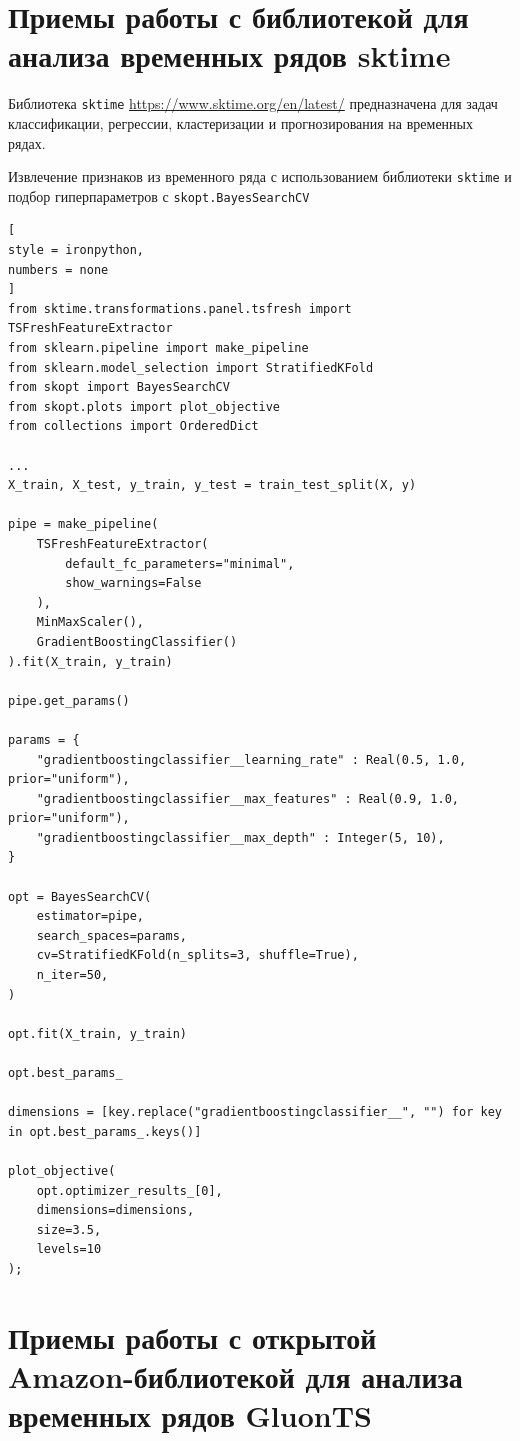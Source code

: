 \documentclass[%
	11pt,
	a4paper,
	utf8,
		]{article}
\begin{document}
\section{Приемы работы с библиотекой для анализа временных рядов sktime}

Библиотека \texttt{sktime} \url{https://www.sktime.org/en/latest/} предназначена для задач классификации, регрессии, кластеризации и прогнозирования на временных рядах.

Извлечение признаков из временного ряда с использованием библиотеки \texttt{sktime} и подбор гиперпараметров с \texttt{skopt.BayesSearchCV}
\begin{lstlisting}[
style = ironpython,
numbers = none	
]
from sktime.transformations.panel.tsfresh import TSFreshFeatureExtractor
from sklearn.pipeline import make_pipeline
from sklearn.model_selection import StratifiedKFold
from skopt import BayesSearchCV
from skopt.plots import plot_objective
from collections import OrderedDict

...
X_train, X_test, y_train, y_test = train_test_split(X, y)

pipe = make_pipeline(
    TSFreshFeatureExtractor(
        default_fc_parameters="minimal",
        show_warnings=False
    ),
    MinMaxScaler(),
    GradientBoostingClassifier()
).fit(X_train, y_train)

pipe.get_params()

params = {
	"gradientboostingclassifier__learning_rate" : Real(0.5, 1.0, prior="uniform"),
	"gradientboostingclassifier__max_features" : Real(0.9, 1.0, prior="uniform"),
	"gradientboostingclassifier__max_depth" : Integer(5, 10),
}

opt = BayesSearchCV(
    estimator=pipe,
    search_spaces=params,
    cv=StratifiedKFold(n_splits=3, shuffle=True),
    n_iter=50,
)

opt.fit(X_train, y_train)

opt.best_params_

dimensions = [key.replace("gradientboostingclassifier__", "") for key in opt.best_params_.keys()]

plot_objective(
    opt.optimizer_results_[0],
    dimensions=dimensions,
    size=3.5,
    levels=10
);
\end{lstlisting}



\section{Приемы работы с открытой Amazon-библиотекой для анализа временных рядов GluonTS}
\end{document}
